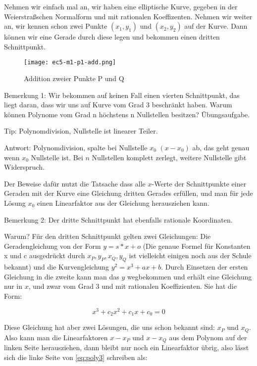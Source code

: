\documentclass{article}
\begin{document}
Nehmen wir einfach mal an, wir haben eine elliptische Kurve, gegeben in der
Weierstraßschen Normalform und mit rationalen
Koeffizenten. Nehmen wir weiter an, wir kennen schon zwei Punkte $(x_1, y_1)$
und $(x_2, y_2)$ auf
der Kurve. Dann können wir eine Gerade durch diese legen und bekommen
einen dritten Schnittpunkt.

\begin{figure}[h]
  \centering
  \texttt{[image: ec5-m1-p1-add.png]}
  \caption{Addition zweier Punkte P und Q}
  
\end{figure}

Bemerkung 1: Wir bekommen auf keinen Fall einen vierten Schnittpunkt, das
liegt daran, dass wir uns auf Kurve vom Grad 3 beschränkt haben. Warum
können Polynome vom Grad n höchstens n Nullstellen besitzen? Übungsaufgabe.

Tip: Polynomdivision, Nullstelle ist linearer Teiler.

Antwort: Polynomdivision, spalte bei Nullstelle $x_0$ $(x - x_0)$ ab, das
geht genau wenn $x_0$ Nullstelle ist. Bei $n$ Nullstellen komplett zerlegt,
weitere Nullstelle gibt Widerspruch.

Der Beweise dafür nutzt die Tatsache dass alle $x$-Werte der Schnittpunkte einer
Geraden mit der Kurve eine Gleichung dritten Gerades erfüllen, und man für
jede Lösung $x_0$ einen Linearfaktor aus der Gleichung herausziehen kann.

Bemerkung 2: Der dritte Schnittpunkt hat ebenfalls rationale Koordinaten.

Warum? Für den dritten Schnittpunkt gelten zwei Gleichungen: Die
Geradengleichung von der Form $y = s * x + o$ (Die genaue Formel für Konstanten
x und c ausgedrückt durch $x_P, y_P, x_Q, y_Q$ ist vielleicht einigen noch aus der
Schule bekannt) und die Kurvengleichung $y^2 = x^3 + ax + b$. Durch Einsetzen
der ersten Gleichung in die zweite kann man das $y$ wegbekommen und erhält eine
Gleichung nur in $x$, und zwar vom Grad 3 und mit rationalen Koeffizienten. Sie
hat die Form:

\begin{equation} \label{eq:poly3}
  x^3 + c_2 x^2 + c_1 x + c_0 = 0
\end{equation}

Diese Gleichung hat aber zwei Lösungen, die uns schon bekannt sind: $x_P$ und
$x_Q$. Also kann man die Linearfaktoren $x - x_P$ und $x - x_Q$ aus dem
Polynom auf der linken Seite herausziehen, dann bleibt nur noch ein
Linearfaktor übrig, also lässt sich die linke Seite von \eqref{eq:poly3}
schreiben als:
\end{document}
